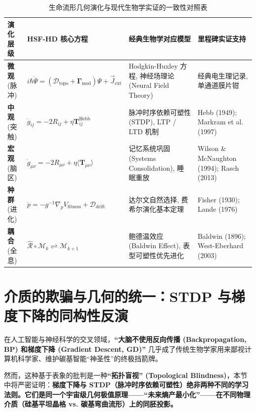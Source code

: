 \begin{table}[htbp]
\centering
\footnotesize
\renewcommand{\arraystretch}{1.6}
\begin{tabularx}{\textwidth}{|l|X|l|l|}
\hline
\rowcolor{gray!10} \textbf{演化层级} & \textbf{HSF-HD 核心方程} & \textbf{经典生物学对应模型} & \textbf{里程碑实证支持} \\ \hline
\textbf{微观} (脉冲) & $i\hbar \dot{\Psi} = (\mathcal{D}_{\text{topo}} + \mathbf{\Gamma}_{\text{mod}})\Psi + \vec{J}_{\text{ext}}$ & Hodgkin-Huxley 方程, 神经场理论 (Neural Field Theory) & 经典电生理记录, 单通道膜片钳 \\ \hline
\textbf{中观} (突触) & $\dot{g}_{ij} = -2R_{ij} + \eta \mathbf{T}_{ij}^{\text{Hebb}}$ & 脉冲时序依赖可塑性 (STDP), LTP / LTD 机制 & Hebb (1949); Markram et al. (1997) \\ \hline
\textbf{宏观} (脑区) & $\dot{g}_{\mu\nu} = -2R_{\mu\nu} + \eta \langle \mathbf{T}_{\mu\nu} \rangle$ & 记忆系统巩固 (Systems Consolidation), 睡眠重放 & Wilson \& McNaughton (1994); Rasch (2013) \\ \hline
\textbf{种群} (进化) & $\dot{p} = -g^{-1} \nabla_p V_{\text{fitness}} + \mathcal{D}_{\text{drift}}$ & 达尔文自然选择, 费希尔演化基本定理 & Fisher (1930); Lande (1976) \\ \hline
\textbf{耦合} (全息) & $\hat{\mathcal{R}} \circ \mathcal{M}_{k} \rightleftharpoons \mathcal{M}_{k+1}$ & 鲍德温效应 (Baldwin Effect), 表型可塑性优先进化 & Baldwin (1896); West-Eberhard (2003) \\ \hline
\end{tabularx}
\caption{生命流形几何演化与现代生物学实证的一致性对照表}
\label{tab:biology_hsfhd_mapping}
\end{table}


\section{介质的欺骗与几何的统一：STDP 与梯度下降的同构性反演}
\label{sec:stdp_vs_gradient_descent_isomorphism}

在人工智能与神经科学的交叉领域，\textbf{“大脑不使用反向传播 (Backpropagation, BP) 和梯度下降 (Gradient Descent, GD)”} 几乎成了传统生物学家用来鄙视计算机科学家、维护碳基智能“神圣性”的终极挡箭牌。

然而，这种基于表象的批判是一种\textbf{“拓扑盲视” (Topological Blindness)}，本节中将严密证明：\textbf{梯度下降与 STDP（脉冲时序依赖可塑性）绝非两种不同的学习法则。它们是同一个宇宙级几何极值原理——“未来熵产最小化”——在不同物理介质（硅基平坦晶格 vs. 碳基弯曲流形）上的同胚投影。}


